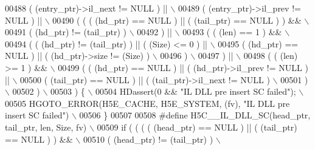 \begin{DoxyCode}
00488 \textcolor{preprocessor}{     ( (entry\_ptr)->il\_next != NULL ) ||                                      \(\backslash\)}
00489 \textcolor{preprocessor}{     ( (entry\_ptr)->il\_prev != NULL ) ||                                      \(\backslash\)}
00490 \textcolor{preprocessor}{     ( ( ( (hd\_ptr) == NULL ) || ( (tail\_ptr) == NULL ) ) &&                  \(\backslash\)}
00491 \textcolor{preprocessor}{       ( (hd\_ptr) != (tail\_ptr) )                                             \(\backslash\)}
00492 \textcolor{preprocessor}{     ) ||                                                                     \(\backslash\)}
00493 \textcolor{preprocessor}{     ( ( (len) == 1 ) &&                                                      \(\backslash\)}
00494 \textcolor{preprocessor}{       ( ( (hd\_ptr) != (tail\_ptr) ) || ( (Size) <= 0 ) ||                     \(\backslash\)}
00495 \textcolor{preprocessor}{         ( (hd\_ptr) == NULL ) || ( (hd\_ptr)->size != (Size) )                 \(\backslash\)}
00496 \textcolor{preprocessor}{       )                                                                      \(\backslash\)}
00497 \textcolor{preprocessor}{     ) ||                                                                     \(\backslash\)}
00498 \textcolor{preprocessor}{     ( ( (len) >= 1 ) &&                                                      \(\backslash\)}
00499 \textcolor{preprocessor}{       ( ( (hd\_ptr) == NULL ) || ( (hd\_ptr)->il\_prev != NULL ) ||             \(\backslash\)}
00500 \textcolor{preprocessor}{         ( (tail\_ptr) == NULL ) || ( (tail\_ptr)->il\_next != NULL )            \(\backslash\)}
00501 \textcolor{preprocessor}{       )                                                                      \(\backslash\)}
00502 \textcolor{preprocessor}{     )                                                                        \(\backslash\)}
00503 \textcolor{preprocessor}{   ) \{                                                                        \(\backslash\)}
00504 \textcolor{preprocessor}{    HDassert(0 && "IL DLL pre insert SC failed");                             \(\backslash\)}
00505 \textcolor{preprocessor}{    HGOTO\_ERROR(H5E\_CACHE, H5E\_SYSTEM, (fv), "IL DLL pre insert SC failed")   \(\backslash\)}
00506 \textcolor{preprocessor}{\}}
00507 
00508 \textcolor{preprocessor}{#define H5C\_\_IL\_DLL\_SC(head\_ptr, tail\_ptr, len, Size, fv)                  \(\backslash\)}
00509 \textcolor{preprocessor}{if ( ( ( ( (head\_ptr) == NULL ) || ( (tail\_ptr) == NULL ) ) &&             \(\backslash\)}
00510 \textcolor{preprocessor}{       ( (head\_ptr) != (tail\_ptr) )                                        \(\backslash\)}

\end{DoxyCode}

